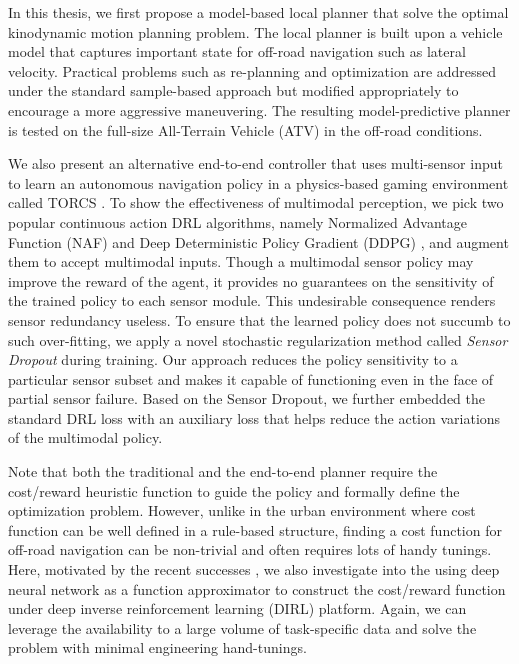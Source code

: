 \documentclass[../thesis.tex]{subfiles}
\begin{document}
In this thesis, we first propose a model-based local planner that solve the optimal kinodynamic motion planning problem. 
The local planner is built upon a vehicle model that captures important state for off-road navigation such as lateral velocity. 
Practical problems such as re-planning and optimization are addressed under the standard sample-based approach but modified appropriately to encourage a more aggressive maneuvering. 
The resulting model-predictive planner is tested on the full-size All-Terrain Vehicle (ATV) in the off-road conditions.
 
We also present an alternative end-to-end controller that uses multi-sensor input to learn an autonomous navigation policy in a physics-based gaming environment called TORCS \cite{wymann2000torcs}. 
To show the effectiveness of multimodal perception, we pick two popular continuous action DRL algorithms, namely Normalized Advantage Function (NAF) \cite{CDQN} and Deep Deterministic Policy Gradient (DDPG) \cite{DBLP:journals/corr/LillicrapHPHETS15}, and augment them to accept multimodal inputs. 
Though a multimodal sensor policy may improve the reward of the agent, it provides no guarantees on the sensitivity of the trained policy to each sensor module.
This undesirable consequence renders sensor redundancy useless. 
To ensure that the learned policy does not succumb to such over-fitting, we apply a novel stochastic regularization method called \emph{Sensor Dropout} during training. 
Our approach reduces the policy sensitivity to a particular sensor subset and makes it capable of functioning even in the face of partial sensor failure. 
Based on the Sensor Dropout, we further embedded the standard DRL loss with an auxiliary loss that helps reduce the action variations of the multimodal policy. 
 
Note that both the traditional and the end-to-end planner require the cost/reward heuristic function to guide the policy and formally define the optimization problem. 
However, unlike in the urban environment where cost function can be well defined in a rule-based structure, finding a cost function for off-road navigation can be non-trivial and often requires lots of handy tunings. \cite{silver2010learning}
Here, motivated by the recent successes \cite{wulfmeier2015maximum,wulfmeier2016watch}, we also investigate into the using deep neural network as a function approximator to construct the cost/reward function under deep inverse reinforcement learning (DIRL) platform. 
Again, we can leverage the availability to a large volume of task-specific data and solve the problem with minimal engineering hand-tunings.
 
\end{document}
